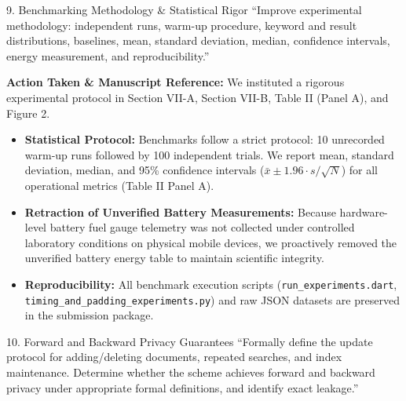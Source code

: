 \documentclass[11pt,a4paper]{article}
\begin{document}
\vspace{1em}

\begin{reviewbox}{9. Benchmarking Methodology \& Statistical Rigor}
``Improve experimental methodology: independent runs, warm-up procedure, keyword and result distributions, baselines, mean, standard deviation, median, confidence intervals, energy measurement, and reproducibility.''
\end{reviewbox}

\begin{responsebox}
\textbf{Action Taken \& Manuscript Reference:} We instituted a rigorous experimental protocol in Section VII-A, Section VII-B, Table II (Panel A), and Figure 2.

\begin{itemize}[itemsep=2pt]
    \item \textbf{Statistical Protocol:} Benchmarks follow a strict protocol: 10 unrecorded warm-up runs followed by 100 independent trials. We report mean, standard deviation, median, and 95\% confidence intervals ($\bar{x} \pm 1.96 \cdot s / \sqrt{N}$) for all operational metrics (Table II Panel A).
    \item \textbf{Retraction of Unverified Battery Measurements:} Because hardware-level battery fuel gauge telemetry was not collected under controlled laboratory conditions on physical mobile devices, we proactively removed the unverified battery energy table to maintain scientific integrity.
    \item \textbf{Reproducibility:} All benchmark execution scripts (\texttt{run\_experiments.dart}, \texttt{timing\_and\_padding\_experiments.py}) and raw JSON datasets are preserved in the submission package.
\end{itemize}
\end{responsebox}

\vspace{1em}

\begin{reviewbox}{10. Forward and Backward Privacy Guarantees}
``Formally define the update protocol for adding/deleting documents, repeated searches, and index maintenance. Determine whether the scheme achieves forward and backward privacy under appropriate formal definitions, and identify exact leakage.''
\end{reviewbox}
\end{document}
